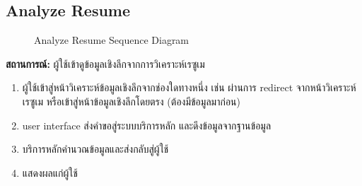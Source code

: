 \subsection{Analyze Resume}
\begin{figure}[H]\centering
    \setlength{\fboxrule}{0.2mm} %
    \caption{Analyze Resume Sequence Diagram}\label{fig:anaResumeSeqDiagram}
\end{figure}
\textbf{สถานการณ์: }ผู้ใช้เข้าดูข้อมูลเชิงลึกจากการวิเคราะห์เรซูเม
\begin{enumerate}
    \item ผู้ใช้เข้าสู่หน้าวิเคราะห์ข้อมูลเชิงลึกจากช่องใดทางหนึ่ง เช่น ผ่านการ redirect จากหน้าวิเคราะห์เรซูเม หรือเข้าสู่หน้าข้อมูลเชิงลึกโดยตรง (ต้องมีข้อมูลมาก่อน)
    \item user interface ส่งคำขอสู่ระบบบริการหลัก และดึงข้อมูลจากฐานข้อมูล
    \item บริการหลักคำนวณข้อมูลและส่งกลับสู่ผู้ใช้
    \item แสดงผลแก่ผู้ใช้
\end{enumerate}

